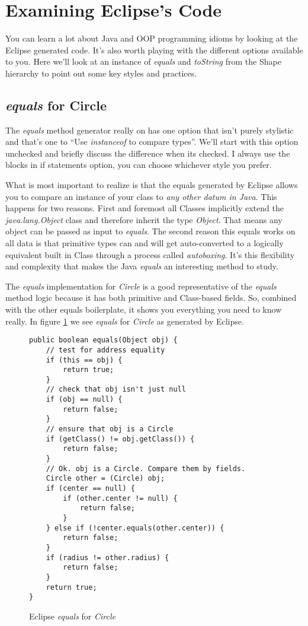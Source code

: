 \documentclass[]{tufte-handout}
\begin{document}
\section{Examining Eclipse's Code}

You can learn a lot about Java and OOP programming idioms by looking at the Eclipse generated code. It's also worth playing with the different options available to you. Here we'll look at an instance of \textit{equals} and \textit{toString} from the Shape hierarchy to point out some key styles and practices. 

\subsection{\textit{equals} for Circle}

The \textit{equals} method generator really on has one option that isn't purely stylistic and that's one to ``Use \textit{instanceof} to compare types''. We'll start with this option unchecked and briefly discuss the difference when its checked. I always use the blocks in if statements option, you can choose whichever style you prefer. 

What is most important to realize is that the equals generated by Eclipse allows you to compare an instance of your class to \textit{any other datum in Java}. This happens for two reasons. First and foremost all Classes implicitly extend the \textit{java.lang.Object} class and therefore inherit the type \textit{Object}. That means any object can be passed as input to \textit{equals}. The second reason this equals works on all data is that primitive types can and will get auto-converted to a logically equivalent built in Class through a process called \textit{autoboxing}. It's this flexibility and complexity that makes the Java \textit{equals} an interesting method to study. 

The \textit{equals} implementation for \textit{Circle} is a good representative of the \textit{equals} method logic because it has both primitive and Class-based fields. So, combined with the other equals boilerplate, it shows you 
everything you need to know really. In figure \ref{fig:circeq} we see \textit{equals} for \textit{Circle} as generated by Eclipse.

\begin{figure}
\begin{lstlisting}
public boolean equals(Object obj) {
    // test for address equality
	if (this == obj) {
		return true;
	}
	// check that obj isn't just null
	if (obj == null) {
		return false;
	}
	// ensure that obj is a Circle
	if (getClass() != obj.getClass()) {
		return false;
	}
	// Ok. obj is a Circle. Compare them by fields.	
	Circle other = (Circle) obj;
	if (center == null) {
		if (other.center != null) {
			return false;
		}
	} else if (!center.equals(other.center)) {
		return false;
	}
	if (radius != other.radius) {
		return false;
	}
	return true;
}
\end{lstlisting}
\label{fig:circeq}
\caption{Eclipse \textit{equals} for \textit{Circle}}
\end{figure}
\end{document}
